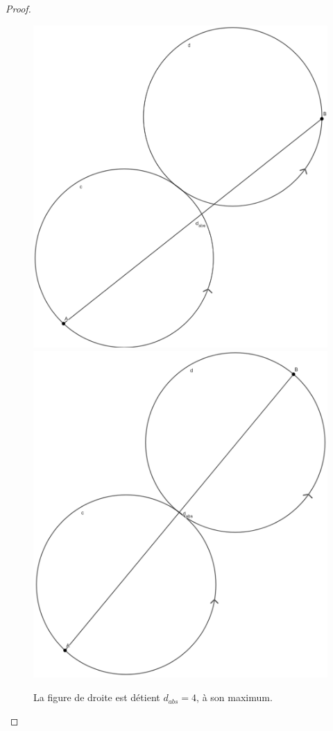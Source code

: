 \documentclass[a4paper]{amsart}
\theoremstyle{definition}
\theoremstyle{remark}
\numberwithin{equation}{section}
\begin{document}
\begin{proof}
  \begin{figure}[H]
    \centering
    \includegraphics[scale=0.15,valign=t]{images/2_worst.png}
    \includegraphics[scale=0.15,valign=t]{images/2.png}
    \caption{La figure de droite est détient $d_{abs}=4$, à son maximum.}
  \end{figure}


\end{proof}
\end{document}
